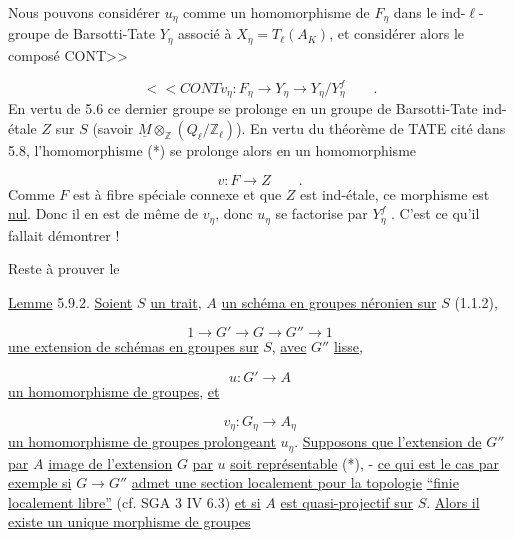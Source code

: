 Nous pouvons considérer $u_\eta$ comme un homomorphisme de $F_\eta$ dans le ind-$\ell$-groupe de Barsotti-Tate $Y_\eta$ associé à $X_\eta = T_\ell(A_K)$, et considérer alors le composé CONT>>



\begin{equation}\tag{*}
<<CONT v_\eta : F_\eta \longrightarrow Y_\eta \longrightarrow Y_\eta/Y_\eta^f \qquad .
\end{equation}
En vertu de 5.6 ce dernier groupe se prolonge en un groupe de Barsotti-Tate ind-étale $Z$ sur $S$ (savoir $\underline{M} \otimes_{\mathbb{Z}} (Q_\ell/\mathbb{Z}_\ell)$). En vertu du théorème de TATE cité dans 5.8, l'homomorphisme (*) se prolonge alors en un homomorphisme

\begin{equation*}
v : F \longrightarrow Z \qquad .
\end{equation*}
Comme $F$ est à fibre spéciale connexe et que $Z$ est ind-étale, ce morphisme est \underline{nul}. Donc il en est de même de $v_\eta$, donc $u_\eta$ se factorise par $Y_\eta^f$ . C'est ce qu'il fallait démontrer !

Reste à prouver le

\underline{Lemme} 5.9.2. \underline{Soient} $S$ \underline{un trait}, $A$ \underline{un schéma en groupes néronien sur} $S$ (1.1.2),

\begin{equation*}
1 \longrightarrow G' \longrightarrow G \longrightarrow G'' \longrightarrow 1
\end{equation*}
\underline{une extension de schémas en groupes sur} $S$, \underline{avec} $G''$ \underline{lisse,}

\begin{equation*}
u : G' \longrightarrow A
\end{equation*}
\underline{un homomorphisme de groupes}, \underline{et}

\begin{equation*}
v_\eta : G_\eta \longrightarrow A_\eta
\end{equation*}
\underline{un homomorphisme de groupes prolongeant} $u_\eta$. \underline{Supposons que l'extension de} $G''$ \underline{par} $A$ \underline{image de l'extension} $G$ \underline{par} $u$ \underline{soit représentable} (*), - \underline{ce qui est le cas par exemple si} $G \longrightarrow G''$ \underline{admet une section localement pour la topologie} \underline{``finie localement libre''} (cf. SGA 3 IV 6.3) \underline{et si} $A$ \underline{est quasi-projectif sur} $S$. \underline{Alors il existe un unique morphisme de groupes}

